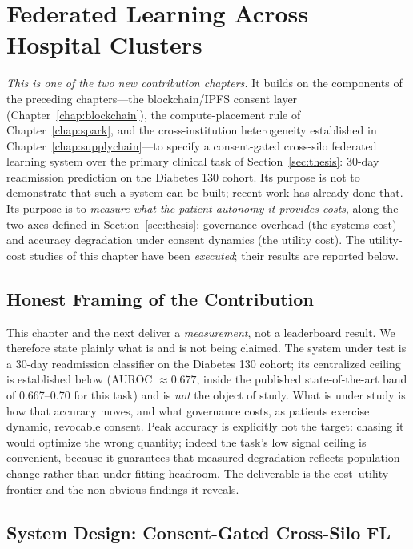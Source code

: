 \documentclass[12pt]{report}
\begin{document}
\chapter{Federated Learning Across Hospital Clusters}
\label{chap:fl_clusters}

\noindent\emph{This is one of the two new contribution chapters.} It builds on the
components of the preceding chapters---the blockchain/IPFS consent layer
(Chapter~\ref{chap:blockchain}), the compute-placement rule of
Chapter~\ref{chap:spark}, and the cross-institution heterogeneity
established in Chapter~\ref{chap:supplychain}---to specify a consent-gated
cross-silo federated learning system over the primary clinical task of
Section~\ref{sec:thesis}: 30-day readmission prediction on the Diabetes 130
cohort. Its purpose is not to demonstrate that such
a system can be built; recent work has already done that. Its purpose is to
\emph{measure what the patient autonomy it provides costs}, along the two axes
defined in Section~\ref{sec:thesis}: governance overhead (the systems cost) and
accuracy degradation under consent dynamics (the utility cost). The utility-cost
studies of this chapter have been \emph{executed}; their results are reported
below.

\section{Honest Framing of the Contribution}

This chapter and the next deliver a \emph{measurement}, not a leaderboard result.
We therefore state plainly what is and is not being claimed. The system under
test is a 30-day readmission classifier on the Diabetes 130 cohort; its
centralized ceiling is established below (AUROC $\approx 0.677$, inside the
published state-of-the-art band of 0.667--0.70 for this task) and is \emph{not}
the object of study. What is
under study is how that accuracy moves, and what governance costs, as patients
exercise dynamic, revocable consent. Peak accuracy is explicitly not the target:
chasing it would optimize the wrong quantity; indeed the task's low signal
ceiling is convenient, because it guarantees that measured degradation reflects
population change rather than under-fitting headroom. The deliverable is the
cost--utility frontier and the non-obvious findings it reveals.

\section{System Design: Consent-Gated Cross-Silo FL}
\label{sec:fl_design}
\end{document}
